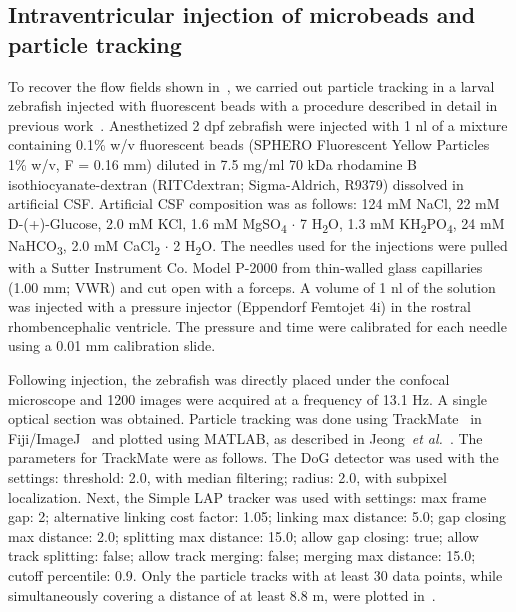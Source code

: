 \documentclass{WileyMSP-template}
\begin{document}
\subsection{Intraventricular injection of microbeads and particle tracking}
To recover the flow fields shown in~, we carried out
particle tracking in a larval zebrafish injected with fluorescent beads with a procedure described in detail in previous work~\cite{Olstad2019CiliaryDevelopment}.
Anesthetized 2 dpf zebrafish were injected with 1 nl of a mixture containing 0.1\% w/v fluorescent beads
(SPHERO Fluorescent Yellow Particles 1\% w/v, F = 0.16 mm) diluted
in 7.5 mg/ml 70 kDa rhodamine B isothiocyanate-dextran (RITCdextran; Sigma-Aldrich, R9379)
dissolved in artificial CSF. Artificial CSF composition was as follows:
124 mM NaCl, 22 mM D-(+)-Glucose, 2.0 mM KCl, 1.6 mM MgSO\textsubscript{4} $\cdot$ 7 H\textsubscript{2}O,
1.3 mM KH\textsubscript{2}PO\textsubscript{4}, 24 mM NaHCO\textsubscript{3},
2.0 mM CaCl\textsubscript{2} $\cdot$ 2 H\textsubscript{2}O.
The needles used for the injections were pulled with a
Sutter Instrument Co. Model P-2000 from thin-walled glass
capillaries (1.00 mm; VWR) and cut open with a forceps.
A volume of 1 nl of the solution was injected with a pressure injector
(Eppendorf Femtojet 4i) in the rostral rhombencephalic ventricle.
The pressure and time were calibrated for each needle using a 0.01 mm calibration slide.

Following injection, the zebrafish was directly placed under the confocal
microscope and 1200 images were acquired at a frequency of 13.1 Hz.
A single optical section was obtained. Particle tracking was done using
TrackMate~\cite{Tinevez2017TrackMate:Tracking} in Fiji/ImageJ~\cite{Schindelin2012Fiji:Analysis}
and plotted using MATLAB, as described in Jeong~\emph{et al.}~\cite{Jeong2022MeasurementTelencephalon}.
The parameters for TrackMate were as follows.
The DoG detector was used with the settings: threshold: 2.0, with
median filtering; radius: 2.0, with subpixel localization.
Next, the Simple LAP tracker was used with settings: max frame gap: 2;
alternative linking cost factor: 1.05; linking max distance: 5.0; gap closing max distance: 2.0;
splitting max distance: 15.0; allow gap closing: true; allow track splitting:
false; allow track merging: false; merging max distance: 15.0; cutoff percentile: 0.9.
Only the particle tracks with at least 30 data points, while simultaneously
covering a distance of at least 8.8 \textmu m, were plotted in~.
\end{document}
